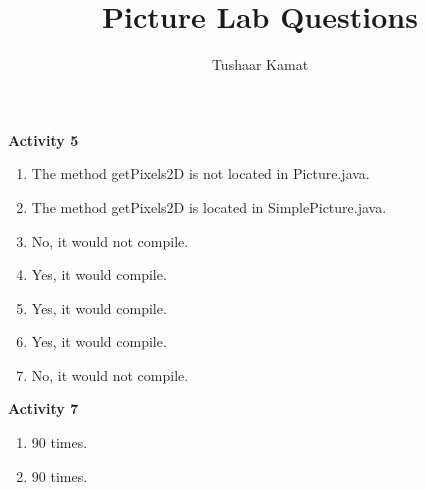 \documentclass[12pt]{article}
\author{Tushaar Kamat}
\title{Picture Lab Questions}
\begin{document}
\maketitle

\textbf{Activity 5}
\begin{enumerate}
  \item The method getPixels2D is not located in Picture.java.
  \item The method getPixels2D is located in SimplePicture.java.
  \item No, it would not compile.
  \item Yes, it would compile. 
  \item Yes, it would compile.
  \item Yes, it would compile.
  \item No, it would not compile. 
\end{enumerate}

\textbf{Activity 7}
\begin{enumerate}
  \item 90 times.  
  \item 90 times.  
\end{enumerate}
\end{document}
